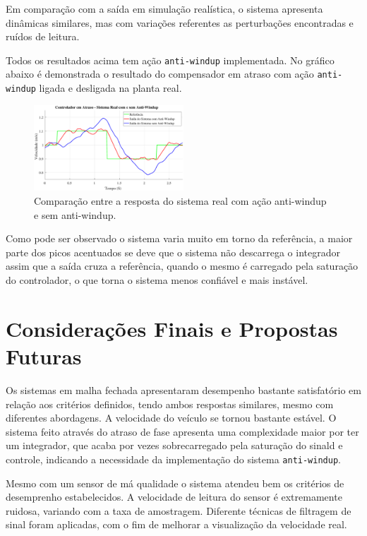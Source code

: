 \documentclass[conference,harvard,brazil,english]{sbatex}
\begin{document}
            Em comparação com a saída em simulação realística, o sistema apresenta dinâmicas similares, mas com variações referentes as perturbações encontradas e ruídos de leitura.
            
            Todos os resultados acima  tem ação \texttt{anti-windup} implementada. No gráfico abaixo é demonstrada o resultado do compensador em atraso com ação \texttt{anti-windup} ligada e desligada na planta real.
            
            \begin{figure}[H]
                \centering
                \includegraphics[width=0.5\textwidth]{imagens/atraso/compAntiWindup.eps}
                \caption{Comparação entre a resposta do sistema real com ação anti-windup e sem anti-windup.}
                \label{fig:realistica_poli_antiwindup}
            \end{figure}
            
            Como pode ser observado o sistema varia muito em torno da referência, a maior parte dos picos acentuados se deve que o sistema não descarrega o integrador assim que a saída cruza a referência, quando o mesmo é carregado pela saturação do controlador, o que torna o sistema menos confiável e mais instável.
        
    \section{Considerações Finais e Propostas Futuras}
    
    
    Os sistemas em malha fechada apresentaram desempenho bastante satisfatório em relação aos critérios definidos, tendo ambos respostas similares, mesmo com diferentes abordagens. A velocidade do veículo se tornou bastante estável. O sistema feito através do atraso de fase apresenta uma complexidade maior por ter um integrador, que acaba por vezes sobrecarregado pela saturação do sinald e controle, indicando a necessidade da implementação do sistema \texttt{anti-windup}.
    
    Mesmo com um sensor de má qualidade o sistema atendeu bem os critérios de desemprenho estabelecidos. A velocidade de leitura do sensor é extremamente ruidosa, variando com a taxa de amostragem. Diferente técnicas de filtragem de sinal foram aplicadas, com o fim de melhorar a visualização da velocidade real.
    
\end{document}
